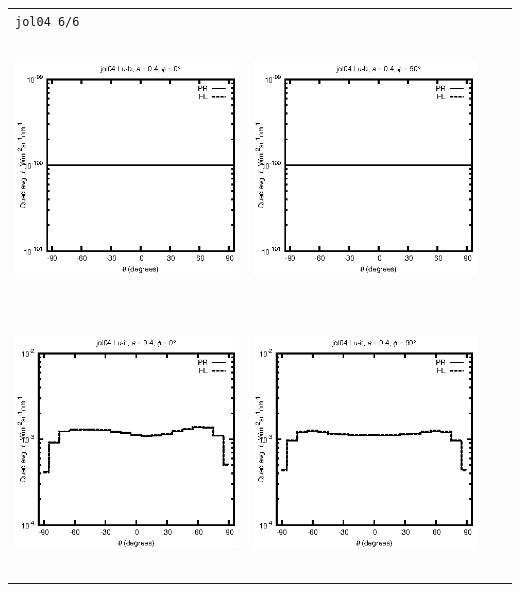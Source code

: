 \begin{tabular}{c c c c}
\multicolumn{4}{l}{\texttt{jol04 6/6}} \\
\includegraphics[height=7cm]{../eps/jol04_Lu_b_fwd.eps} &
\includegraphics[height=7cm]{../eps/jol04_Lu_b_cross.eps} \\
\includegraphics[height=7cm]{../eps/jol04_Lu_it_fwd.eps} &
\includegraphics[height=7cm]{../eps/jol04_Lu_it_cross.eps} \\

\end{tabular}
